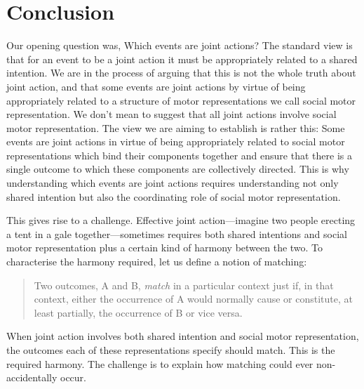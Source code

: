 \documentclass[12pt,\papersize]{extarticle}
\begin{document}
\section{Conclusion}
Our opening question was, Which events are joint actions?
The standard view is that for an event to be a joint action it must be appropriately related to a shared intention.
We are in the process of arguing that this is not the whole truth about joint action,
and that some events are joint actions by virtue of being appropriately related to a structure of motor representations we call social motor representation.
We don’t mean to suggest that all joint actions involve social motor representation.
The view we are aiming to establish is rather this: Some events are joint actions in virtue of being appropriately related to social motor representations which bind their components together and ensure that there is a single outcome to which these components are collectively directed.
This is why 
understanding which events are joint actions requires understanding not only shared intention but also
 the coordinating role of social motor representation.

This gives rise to a challenge. 
Effective joint action—imagine two people erecting a tent in a gale together—sometimes requires both shared intentions and social motor representation plus a certain kind of harmony between the two. 
To characterise the harmony required, let us define a notion of matching:
%
\begin{quote}
Two  outcomes, A and B, \emph{match} in a particular context just if, in that context, either the occurrence of A would normally cause or constitute, at least partially, the occurrence of B or vice versa. 
\end{quote}
%
When joint action involves both shared intention and social motor representation, the outcomes each of these representations specify should match.
This is the required harmony.
The challenge is to explain how matching could ever non-accidentally occur.
\end{document}
